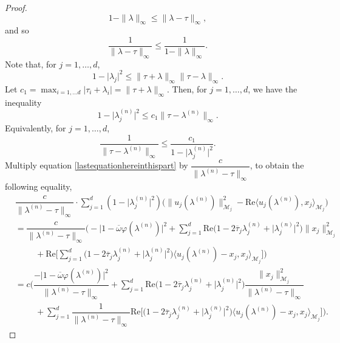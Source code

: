 \documentclass[11pt, reqno]{amsart}
\newcommand\1{\boldsymbol {1}}
\numberwithin{equation}{section}
\begin{document}
\begin{proof}
$$1-\|\lambda\|_{\infty}\leq \|\lambda-\tau\|_{\infty},$$
and so
\begin{equation}\label{inequalitywithc-5}
\dfrac{1}{\|\lambda-\tau\|_{\infty}} \leq \dfrac{1}{1-\|\lambda\|_{\infty}}.
\end{equation}
Note that, for $j=1,\hdots, d$,
$$1-\lvert \lambda_{j}\rvert^{2} \leq \|\tau+\lambda\|_{\infty}\| \tau-\lambda\|_{\infty}.$$
Let $c_{1}=\max_{i=1,\hdots d} \lvert \tau_{i}+\lambda_{i}\rvert = \|\tau+\lambda\|_{\infty}$. Then, for $j=1,\hdots, d$, we have the inequality
\begin{equation}\label{ineqc1}
1-\lvert \lambda^{(n)}_{j}\rvert^{2} \leq c_{1}\|\tau -\lambda^{(n)}\|_{\infty}.
\end{equation}
Equivalently, for $j=1,\hdots, d$,
\begin{equation}\label{inequalityforc1}
\dfrac{1}{\|\tau-\lambda^{(n)}\|_{\infty}} \leq \dfrac{c_{1}}{1-\lvert \lambda^{(n)}_{j} \rvert^{2}}.
\end{equation}
Multiply equation \eqref{lastequationhereinthispart} by $\dfrac{c}{\|\lambda^{(n)}-\tau\|_{\infty}}$, to obtain the following equality, 
\begin{align}\label{equation527}
& \dfrac{c}{\|\lambda^{(n)}-\tau\|_{\infty}}\cdot\sum_{j=1}^{d}(1-\lvert \lambda^{(n)}_{j} \rvert^{2})\Big(\|u_{j}(\lambda^{(n)})\|_{\mathcal{M}_{j}}^{2}-\mathrm{Re} \langle u_{j}(\lambda^{(n)}),x_{j}\rangle_{\mathcal{M}_{j}} \Big)\nonumber\\
&=\dfrac{c}{\|\lambda^{(n)}-\tau\|_{\infty}} \Bigg(-\lvert1-\overline{\omega}\varphi(\lambda^{(n)})\rvert^{2}+\sum_{j=1}^{d}\mathrm{Re}\Big(1-2\overline{\tau}_{j}\lambda^{(n)}_{j}+\lvert\lambda^{(n)}_{j}\rvert^{2}\Big)\|x_{j}\|_{\mathcal{M}_{j}}^{2}
\nonumber\\
&\hspace{1cm}+\mathrm{Re}\bigg[\sum_{j=1}^{d}\Big(1-2\overline{\tau}_{j}\lambda^{(n)}_{j}+\lvert\lambda^{(n)}_{j}\rvert^{2}\Big)\langle u_{j}(\lambda^{(n)})-x_{j},x_{j}\rangle_{\mathcal{M}_{j}}\bigg]\Bigg)\nonumber\\
&=c\Bigg(\dfrac{-\lvert1-\overline{\omega}\varphi(\lambda^{(n)})\rvert^{2}}{\|\lambda^{(n)}-\tau\|_{\infty}}+\sum_{j=1}^{d}\mathrm{Re}\Big(1-2\overline{\tau}_{j}\lambda^{(n)}_{j}+\lvert\lambda^{(n)}_{j}\rvert^{2}\Big)\dfrac{\|x_{j}\|_{\mathcal{M}_{j}}^{2}}{\|\lambda^{(n)}-\tau\|_{\infty}}\nonumber\\
&\hspace{1cm}+\sum_{j=1}^{d}\dfrac{1}{\|\lambda^{(n)}-\tau\|_{\infty}}\mathrm{Re}\bigg[
\Big(1-2\overline{\tau}_{j}\lambda^{(n)}_{j}+\lvert\lambda^{(n)}_{j}\rvert^{2}\Big)\langle u_{j}(\lambda^{(n)})-x_{j},x_{j}\rangle_{\mathcal{M}_{j}}\bigg]\Bigg).
\end{align}


\end{proof}
\end{document}
